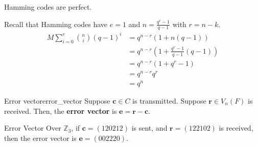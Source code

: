 \begin{Theorem}{}{}
    Hamming codes are perfect.
\end{Theorem}

\begin{Proof}{}{}
    Recall that Hamming codes have $ e=1 $ and $ n=\frac{q^r-1}{q-1} $ with $ r=n-k $.
    \begin{align*}
        M \sum\limits_{i=0}^{e} \binom{n}{i}(q-1)^i
         & =q^{n-r}(1+n(q-1))                               \\
         & =q^{n-r}\left( 1+\frac{q^r-1}{q-1} (q-1) \right) \\
         & = q^{n-r}(1+q^r-1)                               \\
         & =q^{n-r}q^r                                      \\
         & =q^n
    \end{align*}
\end{Proof}

\begin{Definition}{Error vector}{error_vector}
    Suppose $ \symbf{c}\in C $ is transmitted. Suppose $ \symbf{r}\in V_n(F) $ is received.
    Then, the \textbf{error vector} is $ \symbf{e}=\symbf{r}-\symbf{c} $.
\end{Definition}

\begin{Example}{Error Vector}{}
    Over $ \mathbb{Z}_3 $, if $ \symbf{c}=(120212) $ is sent, and $ \symbf{r}=(122102) $ is received, then
    the error vector is $ \symbf{e}=(002220) $.
\end{Example}
